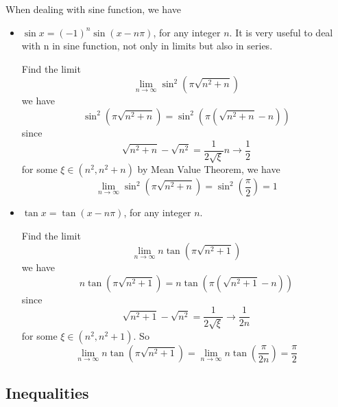 \documentclass{overview}
\begin{document}
When dealing with sine function, we have
\begin{itemize}
	\item $\sin x= (-1)^{n}\sin(x-n\pi)$, for any integer $n$. It is very useful
		to deal with n in sine function, not only in limits but also in series.
		\begin{example}
			Find the limit
			\[
				\lim_{n \to \infty} \sin^2\left(\pi \sqrt{n^2 + n}\right)
			\]
			we have
			\[
				\sin^2\left(\pi \sqrt{n^2 + n}\right)
				=\sin^2\left(\pi \left(\sqrt{n^2 + n} - n\right)\right)
			\]
			since
			\[
				\sqrt{n^2 + n} - \sqrt{n^2} = \dfrac{1}{2\sqrt{\xi}}n \to \frac{1}{2}
			\]
			for some $\xi \in (n^2, n^2+n)$ by Mean Value Theorem, we have
			\[
				\lim_{n \to \infty} \sin^2\left(\pi \sqrt{n^2 + n}\right)
				= \sin^2\left(\frac{\pi}{2}\right) = 1
			\]
		\end{example}
	\item $\tan x = \tan(x-n\pi)$, for any integer $n$.
		\begin{example}
			Find the limit
			\[
				\lim_{n \to \infty} n \tan\left(\pi \sqrt{n^2 + 1}\right)
			\]
			we have
			\[
				n \tan\left(\pi \sqrt{n^2 + 1}\right)
				=n \tan\left(\pi \left(\sqrt{n^2 + 1} - n\right)\right)
			\]
			since
			\[
				\sqrt{n^2 + 1} - \sqrt{n^2} = \dfrac{1}{2\sqrt{\xi}} \to \frac{1}{2n}
			\]
			for some $\xi \in (n^2, n^2+1)$. So
			\[
				\lim_{n \to \infty} n \tan\left(\pi \sqrt{n^2 + 1}\right)
				= \lim_{n \to \infty} n \tan\left(\frac{\pi}{2n}\right)
				= \frac{\pi}{2}
			\]
		\end{example}
	
\end{itemize}

\subsection{Inequalities}
\end{document}
